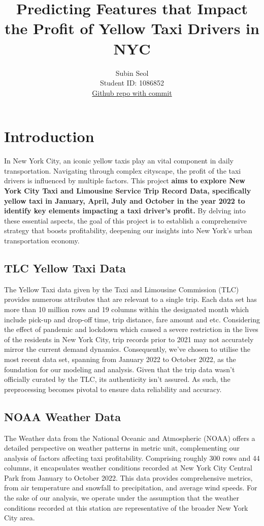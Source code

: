 \documentclass[11pt]{article}
\title{\textbf{Predicting Features that Impact the Profit of Yellow Taxi Drivers in NYC}}
\author{
Subin Seol \\
Student ID: 1086852 \\
\href{https://github.com/MAST30034-Applied-Data-Science/mast30034-project-1-subinai}{Github repo with commit}
}
\begin{document}
\maketitle

\section{Introduction}

In New York City, an iconic yellow taxis play an vital component in daily transportation. Navigating through complex cityscape, the profit of the taxi drivers is influenced by multiple factors. This project \textbf{aims to explore New York City Taxi and Limousine Service Trip Record Data, specifically yellow taxi in January, April, July and October in the year 2022 to identify key elements impacting a taxi driver's profit.} By delving into these essential aspects, the goal of this project is to establish a comprehensive strategy that boosts profitability, deepening our insights into New York's urban transportation economy.

\subsection{TLC Yellow Taxi Data}

The Yellow Taxi data given by the Taxi and Limousine Commission (TLC)\cite{2022sensorreading} provides numerous attributes that are relevant to a single trip. Each data set has more than 10 million rows and 19 columns within the designated month which include pick-up and drop-off time, trip distance, fare amount and etc. Considering the effect of pandemic and lockdown which caused a severe restriction in the lives of the residents in New York City, trip records prior to 2021 may not accurately mirror the current demand dynamics. Consequently, we've chosen to utilise the most recent data set, spanning from January 2022 to October 2022, as the foundation for our modeling and analysis. Given that the trip data wasn't officially curated by the TLC, its authenticity isn't assured. As such, the preprocessing becomes pivotal to ensure data reliability and accuracy.

\subsection{NOAA Weather Data}
The Weather data from the National Oceanic and Atmospheric (NOAA)\cite{2022sensorlocation} offers a detailed perspective on weather patterns in metric unit, complementing our analysis of factors affecting taxi profitability. Comprising roughly 300 rows and 44 columns, it encapsulates weather conditions recorded at New York City Central Park from January to October 2022. This data provides comprehensive metrics, from air temperature and snowfall to precipitation, and average wind speeds. For the sake of our analysis, we operate under the assumption that the weather conditions recorded at this station are representative of the broader New York City area.
\end{document}
